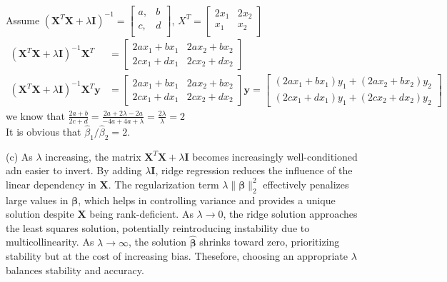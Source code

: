 \documentclass[a4paper,12pt]{article}
\begin{document}
Assume \((\bm{X}^T\bm{X} + \lambda\bm{I})^{-1} = \begin{bmatrix}
    a, &b \\
    c, &d \\
\end{bmatrix}\),
\(X^T = \begin{bmatrix}
    2x_1 &2x_2 \\
    x_1 &x_2\\
\end{bmatrix}\)
\begin{align*}
    (\bm{X}^T\bm{X} + \lambda \bm{I})^{-1}\bm{X}^T &= \begin{bmatrix}
        2ax_1 + bx_1  &2ax_2 + bx_2 \\
        2cx_1 + dx_1  &2cx_2 + dx_2
    \end{bmatrix} \\
    (\bm{X}^T\bm{X} + \lambda \bm{I})^{-1}\bm{X}^T\bm{y} &= \begin{bmatrix}
        2ax_1 + bx_1  &2ax_2 + bx_2 \\
        2cx_1 + dx_1  &2cx_2 + dx_2
    \end{bmatrix}\bm{y} = \begin{bmatrix}
        (2ax_1 + bx_1)y_1 + (2ax_2 + bx_2)y_2 \\
        (2cx_1 + dx_1)y_1 + (2cx_2 + dx_2)y_2
    \end{bmatrix}
\end{align*}
we know that \(\frac{2a + b}{2c + d} = \frac{2a + 2\lambda - 2a}{-4a + 4a + \lambda} = \frac{2\lambda}{\lambda} = 2\) \\
It is obvious that \({\hat{\beta}_1} / {\hat{\beta}_2} = 2\).

(c)
As \(\lambda\) increasing, the matrix \(\bm{X}^T\bm{X} + \lambda\bm{I}\) becomes increasingly well-conditioned adn easier to invert.
By adding \(\lambda\bm{I}\), ridge regression reduces the influence of the linear dependency in \(\bm{X}\).
The regularization term \(\lambda\|\bm{\beta}\|_2^2\) effectively penalizes large values in \(\bm{\beta}\),
which helps in controlling variance and provides a unique solution despite \(\bm{X}\) being rank-deficient.
As \(\lambda \to 0\), the ridge solution approaches the least squares solution, potentially reintroducing instability due to 
multicollinearity. As \(\lambda \to \infty\), the solution \(\hat{\bm{\beta}}\) shrinks toward zero, prioritizing stability but
at the cost of increasing bias. Thesefore, choosing an appropriate \(\lambda\) balances stability and accuracy.
\end{document}
